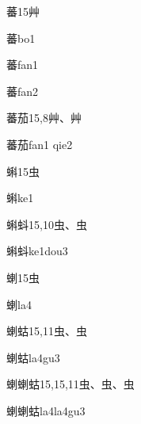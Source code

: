 \begin{Entry}{蕃}{15}{⾋}
  \begin{Phonetics}{蕃}{bo1}
  \end{Phonetics}
  \begin{Phonetics}{蕃}{fan1}
  \end{Phonetics}
  \begin{Phonetics}{蕃}{fan2}
  \end{Phonetics}
\end{Entry}

\begin{Entry}{蕃茄}{15,8}{⾋、⾋}
  \begin{Phonetics}{蕃茄}{fan1 qie2}
  \end{Phonetics}
\end{Entry}

\begin{Entry}{蝌}{15}{⾍}
  \begin{Phonetics}{蝌}{ke1}
  \end{Phonetics}
\end{Entry}

\begin{Entry}{蝌蚪}{15,10}{⾍、⾍}
  \begin{Phonetics}{蝌蚪}{ke1dou3}
  \end{Phonetics}
\end{Entry}

\begin{Entry}{蝲}{15}{⾍}
  \begin{Phonetics}{蝲}{la4}
  \end{Phonetics}
\end{Entry}

\begin{Entry}{蝲蛄}{15,11}{⾍、⾍}
  \begin{Phonetics}{蝲蛄}{la4gu3}
  \end{Phonetics}
\end{Entry}

\begin{Entry}{蝲蝲蛄}{15,15,11}{⾍、⾍、⾍}
  \begin{Phonetics}{蝲蝲蛄}{la4la4gu3}
  \end{Phonetics}
\end{Entry}

